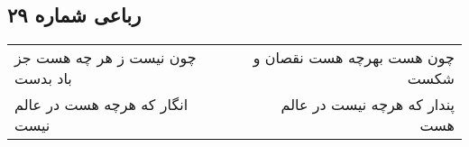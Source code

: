 \begin{center}
\section*{رباعی شماره ۲۹}
\label{sec:sh029}
\begin{longtable}{l p{0.5cm} r}
چون نیست ز هر چه هست جز باد بدست
&&
چون هست بهرچه هست نقصان و شکست
\\
انگار که هرچه هست در عالم نیست
&&
پندار که هرچه نیست در عالم هست
\\
\end{longtable}
\end{center}
